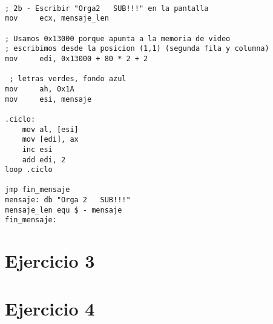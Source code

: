 \begin{verbatim}

; 2b - Escribir "Orga2   SUB!!!" en la pantalla
mov     ecx, mensaje_len

; Usamos 0x13000 porque apunta a la memoria de video
; escribimos desde la posicion (1,1) (segunda fila y columna)
mov     edi, 0x13000 + 80 * 2 + 2   

 ; letras verdes, fondo azul
mov     ah, 0x1A
mov     esi, mensaje

.ciclo:
	mov al, [esi]
	mov [edi], ax
	inc esi
	add edi, 2
loop .ciclo

jmp fin_mensaje
mensaje: db "Orga 2   SUB!!!"
mensaje_len equ $ - mensaje
fin_mensaje:

\end{verbatim}


\section{Ejercicio 3}


\section{Ejercicio 4}
